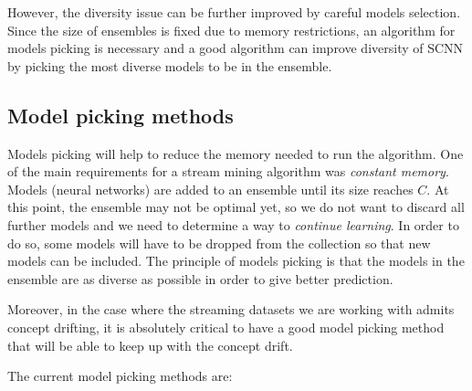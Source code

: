 \documentclass[conference]{IEEEtran}
\begin{document}
		However, the diversity issue can be further improved by careful models selection. Since the size of ensembles is fixed due to memory restrictions, an algorithm for models picking is necessary and a good algorithm can improve diversity of SCNN by picking the most diverse models to be in the ensemble.
		
		\subsection{Model picking methods}
		\label{sec:model-picking}
				
		Models picking will help to reduce the memory needed to run the algorithm. One of the main requirements for a stream mining algorithm was \emph{constant memory}. Models (neural networks) are added to an ensemble until its size reaches $C$. At this point, the ensemble may not be optimal yet, so we do not want to discard all further models and we need to determine a way to \emph{continue learning}. In order to do so, some models will have to be dropped from the collection so that new models can be included. The principle of models picking is that the models in the ensemble are as diverse as possible in order to give better prediction. 
		
		Moreover, in the case where the streaming datasets we are working with admits concept drifting, it is absolutely critical	to have a good model picking method that will be able to keep up with the concept drift.
		
		The current model picking methods are:
\end{document}
